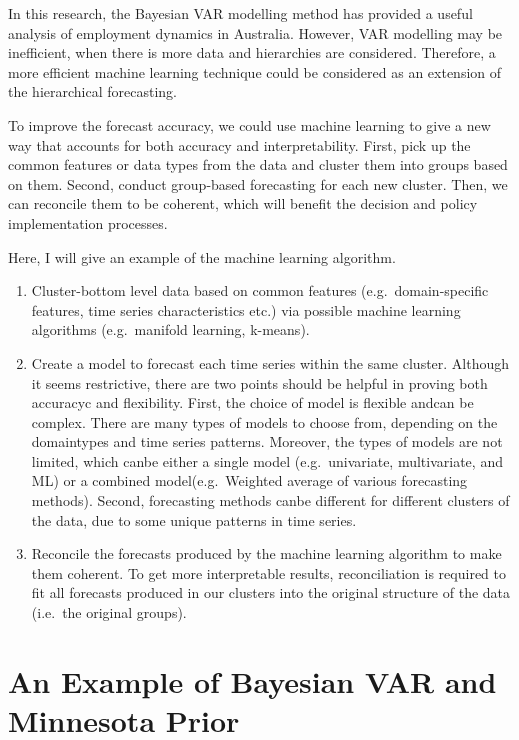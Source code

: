 \documentclass{monashthesis}
\begin{document}
In this research, the Bayesian VAR modelling method has provided a useful analysis of employment dynamics in Australia. However, VAR modelling may be inefficient, when there is more data and hierarchies are considered. Therefore, a more efficient machine learning technique could be considered as an extension of the hierarchical forecasting.

To improve the forecast accuracy, we could use machine learning to give a new way that accounts for both accuracy and interpretability. First, pick up the common features or data types from the data and cluster them into groups based on them. Second, conduct group-based forecasting for each new cluster. Then, we can reconcile them to be coherent, which will benefit the decision and policy implementation processes.

Here, I will give an example of the machine learning algorithm.

\begin{enumerate}
\def\labelenumi{\arabic{enumi}.}
\item
  Cluster-bottom level data based on common features (e.g.~domain-specific features, time series characteristics etc.) via possible machine learning algorithms (e.g.~manifold learning, k-means).
\item
  Create a model to forecast each time series within the same cluster. Although it seems restrictive, there are two points should be helpful in proving both accuracyc and flexibility. First, the choice of model is flexible andcan be complex. There are many types of models to choose from, depending on the domaintypes and time series patterns. Moreover, the types of models are not limited, which canbe either a single model (e.g.~univariate, multivariate, and ML) or a combined model(e.g.~Weighted average of various forecasting methods). Second, forecasting methods canbe different for different clusters of the data, due to some unique patterns in time series.
\item
  Reconcile the forecasts produced by the machine learning algorithm to make them coherent. To get more interpretable results, reconciliation is required to fit all forecasts produced in our clusters into the original structure of the data (i.e.~the original groups).
\end{enumerate}

\appendix

\hypertarget{an-example-of-bayesian-var-and-minnesota-prior}{%
\chapter{An Example of Bayesian VAR and Minnesota Prior}\label{an-example-of-bayesian-var-and-minnesota-prior}}
\end{document}
